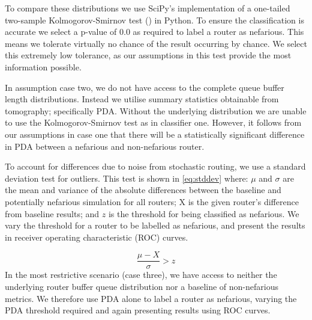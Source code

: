To compare these distributions we use SciPy's implementation of a one-tailed two-sample Kolmogorov-Smirnov test (\cite{chakravarti_handbook_1967}) in Python. To ensure the classification is accurate we select a p-value of 0.0 as required to label a router as nefarious. This means we tolerate virtually no chance of the result occurring by chance. We select this extremely low tolerance, as our assumptions in this test provide the most information possible.\par
In assumption case two, we do not have access to the complete queue buffer length distributions. Instead we utilise summary statistics obtainable from tomography; specifically PDA. Without the underlying distribution we are unable to use the Kolmogorov-Smirnov test as in classifier one.  However, it follows from our assumptions in case one that there will be a statistically significant difference in PDA between a nefarious and non-nefarious router.\par
To account for differences due to noise from stochastic routing, we use a standard deviation test for outliers. This test is shown in \cref{eq:stddev} where: $\mu$ and $\sigma$ are the mean and variance of the absolute differences between the baseline and potentially nefarious simulation for all routers; X is the given router's difference from baseline results; and $z$ is the threshold for being classified as nefarious. We vary the threshold for a router to be labelled as nefarious, and present the results in receiver operating characteristic (ROC) curves.\par
\begin{equation}
\label{eq:stddev}
  \frac{\mu-X}{\sigma}>z
\end{equation}
In the most restrictive scenario (case three), we have access to neither the underlying router buffer queue distribution nor a baseline of non-nefarious metrics. We therefore use PDA alone to label a router as nefarious, varying the PDA threshold required and again presenting results using ROC curves.\par
  
